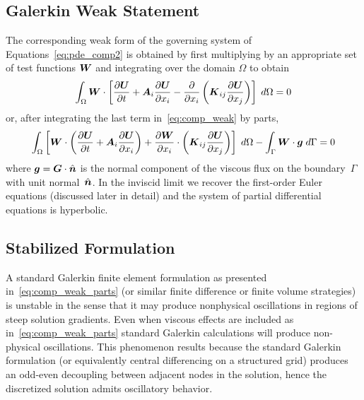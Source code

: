 \subsection{Galerkin Weak Statement}
The corresponding weak form of the governing system of Equations~\eqref{eq:pde_comp2} is obtained by first multiplying by an appropriate set of test functions ${\boldsymbol{W}}$ and integrating  over the domain $\Omega$ to obtain
\begin{equation}
  \label{eq:comp_weak}
  \int_\Omega {\boldsymbol{W}} \cdot \left[ {\frac{\partial{{\boldsymbol{U}}}}{\partial{t}}} + {\boldsymbol{A}}_i {\frac{\partial{{\boldsymbol{U}}}}{\partial{x_i}}} - {\frac{\partial{}}{\partial{x_i}}} \left( {\boldsymbol{K}}_{ij} {\frac{\partial{{\boldsymbol{U}}}}{\partial{x_j}}} \right) \right] \; d\Omega = 0
\end{equation}
or, after integrating the last term in~\eqref{eq:comp_weak} by parts,
\begin{equation}
  \label{eq:comp_weak_parts}
  \int_\Omega  \left[ {\boldsymbol{W}}\cdot\left({\frac{\partial{{\boldsymbol{U}}}}{\partial{t}}} + {\boldsymbol{A}}_i {\frac{\partial{{\boldsymbol{U}}}}{\partial{x_i}}} \right) + {\frac{\partial{{\boldsymbol{W}}}}{\partial{x_i}}} \cdot \left( {\boldsymbol{K}}_{ij} {\frac{\partial{{\boldsymbol{U}}}}{\partial{x_j}}} \right) \right] \; d\Omega - \int_\Gamma {\boldsymbol{W}}\cdot{\boldsymbol{g}} \; d\Gamma = 0
\end{equation}
where ${\boldsymbol{g}} = {\boldsymbol{G}}\cdot\hat{{\boldsymbol{n}}}$ is the normal component of the viscous flux on the boundary~$\Gamma$ with unit normal~$\hat{{\boldsymbol{n}}}$.  In the inviscid limit we recover the first-order Euler equations (discussed later in detail) and the system of partial differential equations is hyperbolic.



\subsection{Stabilized Formulation\label{sect:comp_sc}}
A standard Galerkin finite element formulation as presented in~\eqref{eq:comp_weak_parts}  (or similar finite difference or finite volume strategies) is unstable in the sense that it may produce nonphysical oscillations in regions of steep solution gradients. Even when viscous effects are included as in~\eqref{eq:comp_weak_parts} standard Galerkin calculations will produce non-physical oscillations. This phenomenon results because the standard Galerkin formulation (or equivalently central differencing on a structured grid) produces an odd-even decoupling between adjacent nodes in the solution, hence the discretized solution admits oscillatory behavior.

